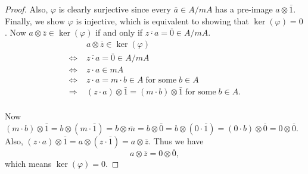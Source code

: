\documentclass{article}
\begin{document}
\begin{enumerate}[label={(\alph*)}]
\begin{proof}
        Also, $\varphi$ is clearly surjective since every $\overline{a}\in
        A/mA$ has a pre-image $a\otimes\bar{1}$. Finally, we show $\varphi$
        is injective, which is equivalent to showing that
        $\ker(\varphi)=0$. Now $a\otimes\bar{z}\in\ker(\varphi)$ if and
        only if $\overline{z\cdot a}=\overline{0}\in A/mA$.
        \begin{align*}
          \;&a\otimes\overline{z}\in\ker(\varphi)\\
          \Leftrightarrow\;&\overline{z\cdot a}=\overline{0}\in A/mA\\
          \Leftrightarrow\;&z\cdot a\in mA\\
          \Leftrightarrow\;&z\cdot a =m\cdot b\in A\; \text{for some}\;
            b\in A\\
          \Rightarrow\;&(z\cdot a)\otimes\bar{1}=(m\cdot
            b)\otimes\bar{1}\; \text{for some}\; b\in A.\\
        \end{align*}

        Now $(m\cdot b)\otimes\bar{1} =b\otimes(m\cdot\bar{1})
        =b\otimes\overline{m} =b\otimes\bar{0} =b\otimes(0\cdot\bar{1})
        =(0\cdot b)\otimes\overline{0} =0\otimes\overline{0}$. Also,
        $(z\cdot a)\otimes\bar{1} =a\otimes(z\cdot\bar{1})
        =a\otimes\overline{z}$. Thus we have
        \[a\otimes\overline{z} =0\otimes\overline{0},\]
        which means $\ker(\varphi)=0$.
      \end{proof}
  \end{enumerate}
\end{document}
